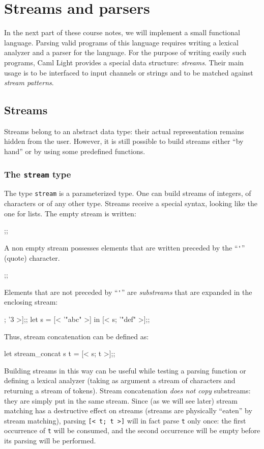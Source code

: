 \chapter{Streams and parsers}\label{c:streams}

In the next part of these course notes, we will implement a small
functional language. Parsing valid programs of this language requires
writing a lexical analyzer and a parser for the language. For the
purpose of writing easily such programs, Caml Light provides a special
data structure: {\em streams}. Their main usage is to be interfaced to
input channels or strings and to be matched against {\em stream
patterns}.

\section{Streams}

Streams belong to an abstract data type: their actual representation
remains hidden from the user. However, it is still possible to build
streams either ``by hand'' or by using some predefined functions.

\subsection{The {\tt stream} type}

The type {\tt stream} is a parameterized type. One can build streams
of integers, of characters or of any other type. Streams receive a
special syntax, looking like the one for lists. The empty stream is
written:
\begin{caml_example}
[< >];;
\end{caml_example}
A non empty stream possesses elements that are written preceded by the
``\verb|'|'' (quote) character.
\begin{caml_example}
[< '0; '1; '2 >];;
\end{caml_example}
Elements that are not preceded by ``\verb|'|'' are {\em substreams}
that are expanded in the enclosing stream:
\begin{caml_example}
[< '0; [<'1;'2>]; '3 >];;
let s = [< '"abc" >] in [< s; '"def" >];;
\end{caml_example}
Thus, stream concatenation can be defined as:
\begin{caml_example}
let stream_concat s t = [< s; t >];;
\end{caml_example}
Building streams in this way can be useful while testing a parsing
function or defining a lexical analyzer (taking as argument a stream
of characters and returning a stream of tokens). Stream concatenation
{\em does not copy} substreams: they are simply put in the same
stream. Since (as we will see later) stream matching has a
destructive effect on streams (streams are physically ``eaten'' by
stream matching), parsing \verb|[< t; t >]| will in fact parse {\tt t}
only once: the first occurrence of {\tt t} will be consumed, and the
second occurrence will be empty before its parsing will be performed.

